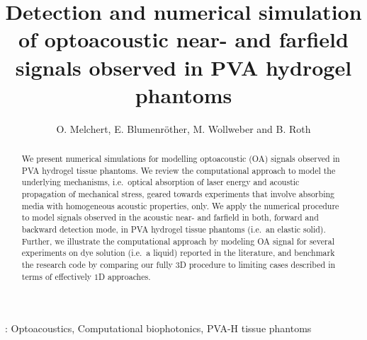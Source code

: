 \documentclass[12pt]{iopart}
\begin{document}
\title[OA Signals in PVA hydrogel phantoms]{Detection and numerical simulation
of optoacoustic near- and farfield signals observed in PVA hydrogel phantoms}

\author{O. Melchert, E. Blumenr\"other, M. Wollweber and B. Roth}

\address{Hanover Centre for Optical Technologies (HOT), Leibniz Universit\"at Hannover, Nienburger Str.\,17, D-30167 Hannover, Germany}

\begin{abstract}
We present numerical simulations for modelling optoacoustic (OA) signals
observed in PVA hydrogel tissue phantoms.  We review the computational
approach to model the underlying mechanisms, i.e.\ optical absorption of laser
energy and acoustic propagation of mechanical stress, geared towards experiments
that involve absorbing media with homogeneous acoustic properties, only. 
We apply the numerical procedure to model signals observed in the acoustic
near- and farfield in both, forward and backward detection mode, in PVA
hydrogel tissue phantoms (i.e.\ an elastic solid).
Further, we illustrate the computational approach by modeling OA signal for 
several experiments on dye solution (i.e.\ a liquid) reported in the 
literature, and benchmark the research code by comparing our fully $3$D 
procedure to limiting cases described in terms of effectively $1$D approaches.
\end{abstract}


\vspace{2pc}
: Optoacoustics, Computational biophotonics, PVA-H tissue phantoms


\maketitle


\end{document}
